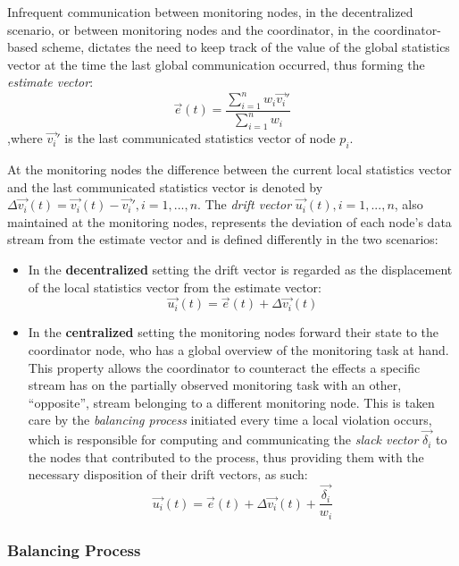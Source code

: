 Infrequent communication between monitoring nodes, in the decentralized scenario, or between monitoring nodes and the coordinator, in the coordinator-based scheme, dictates the need to keep track of the value of the global statistics vector at the time the last global communication occurred, thus forming the \emph{estimate vector}:
\begin{equation}
\vec{e}(t)=\frac{\sum_{i=1}^n {w_i \vec{v_i}'}}{\sum_{i=1}^n {w_i}}
\label{form:estimateVector}
\end{equation}
,where $\vec{v_i}'$ is the last communicated statistics vector of node $p_i$.

At the monitoring nodes the difference between the current local statistics vector and the last communicated statistics vector is denoted by $\Delta \vec{v_i}(t)=\vec{v_i}(t)-\vec{v_i}', i=1,...,n$. The \emph{drift vector} $\vec{u_i}(t), i=1,...,n$, also maintained at the monitoring nodes, represents the deviation of each node's data stream from the estimate vector and is defined differently in the two scenarios:
\begin{itemize}
\item In the \textbf{decentralized} setting the drift vector is regarded as the displacement of the local statistics vector from the estimate vector:
\begin{equation}
\vec{u_i}(t)=\vec{e}(t)+\Delta \vec{v_i}(t)
\label{form:decentralizedDrift}
\end{equation}
\item In the \textbf{centralized} setting the monitoring nodes forward their state to the coordinator node, who has a global overview of the monitoring task at hand. This property allows the coordinator to counteract the effects a specific stream has on the partially observed monitoring task with an other, ``opposite'', stream belonging to a different monitoring node. This is taken care by the \emph{balancing process} initiated every time a local violation occurs, which is responsible for computing and communicating the \emph{slack vector} $\vec{\delta_i}$ to the nodes that contributed to the process, thus providing them with the necessary disposition of their drift vectors, as such:
\begin{equation}
\vec{u_i}(t)=\vec{e}(t)+\Delta \vec{v_i}(t)+\frac{\vec{\delta_i}}{w_i}
\label{form:centralizedDrift}
\end{equation} 
\end{itemize}

\subsubsection{Balancing Process} \label{subsubsec:theorBack-GM-balancingProc}

